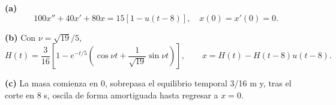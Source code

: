 \noindent\textbf{(a)} \[100x''+40x'+80x=15[1-u(t-8)],\quad x(0)=x'(0)=0.\]

\noindent\textbf{(b)} Con \(\nu=\sqrt{19}/5\),
\[H(t)=\frac3{16}\left[1-e^{-t/5}\left(\cos\nu t+\frac1{\sqrt{19}}\sin\nu t\right)\right],\qquad x=H(t)-H(t-8)u(t-8).\]

\noindent\textbf{(c)} La masa comienza en 0, sobrepasa el equilibrio temporal 3/16 m y, tras el corte en 8 s, oscila de forma amortiguada hasta regresar a \(x=0\).
